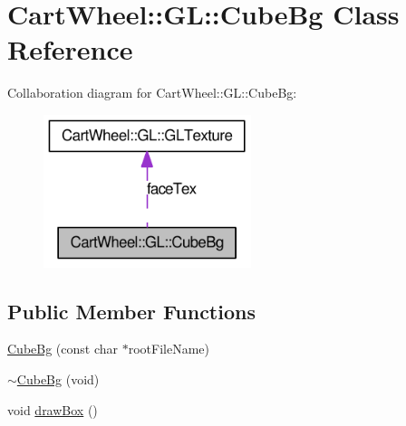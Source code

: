 \hypertarget{classCartWheel_1_1GL_1_1CubeBg}{
\section{CartWheel::GL::CubeBg Class Reference}
\label{classCartWheel_1_1GL_1_1CubeBg}
}


Collaboration diagram for CartWheel::GL::CubeBg:\nopagebreak
\begin{figure}[H]
\begin{center}
\leavevmode
\includegraphics[width=172pt]{classCartWheel_1_1GL_1_1CubeBg__coll__graph}
\end{center}
\end{figure}
\subsection*{Public Member Functions}
\begin{DoxyCompactItemize}
\item 
\hyperlink{classCartWheel_1_1GL_1_1CubeBg_af8c13ad03f8894416ed5b7ebe01f3a63}{CubeBg} (const char $\ast$rootFileName)
\item 
\hyperlink{classCartWheel_1_1GL_1_1CubeBg_a91ad0f4ba08c14b0c2acb98196c56f92}{$\sim$CubeBg} (void)
\item 
void \hyperlink{classCartWheel_1_1GL_1_1CubeBg_ae4fa42c93d7e5f4d8cb69218146536e2}{drawBox} ()
\end{DoxyCompactItemize}


